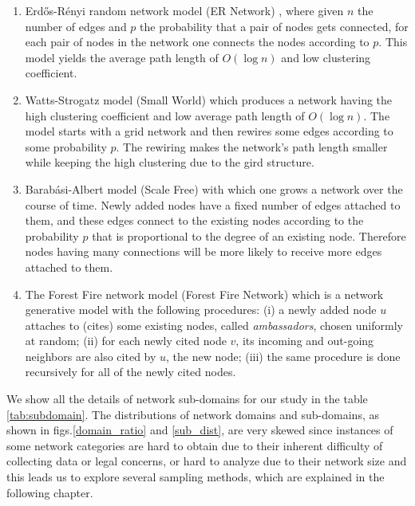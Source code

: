 \documentclass[..]{revtex4}
\begin{document}
	\begin{enumerate}
		\item Erd\H{o}s-R\'enyi random network model (ER Network) \cite{ER_Network}, where given $n$ the number of edges and $p$ the probability that a pair of nodes gets connected, for each pair of nodes in the network one connects the nodes according to $p$. This model yields the average path length of $O(\log n)$ and low clustering coefficient.
		
		\item Watts-Strogatz model (Small World) \cite{watts1998cds} which produces a network having the high clustering coefficient and low average path length of $O(\log n)$. The model starts with a grid network and then rewires some edges according to some probability $p$. The rewiring makes the network's path length smaller while keeping the high clustering due to the gird structure.
		
		\item Barab\'asi-Albert model (Scale Free) \cite{Barabasi99emergenceScaling} with which one grows a network over the course of time. Newly added nodes have a fixed number of edges attached to them, and these edges connect to the existing nodes according to the probability $p$ that is proportional to the degree of an existing node. Therefore nodes having many connections will be more likely to receive more edges attached to them.
		
		\item The Forest Fire network model (Forest Fire Network) \cite{ForestFire} which is a network generative model with the following procedures: (i) a newly added node $u$ attaches to (cites) some existing nodes, called \textit{ambassadors}, chosen uniformly at random; (ii) for each newly cited node $v$, its incoming and out-going neighbors are also cited by $u$, the new node; (iii) the same procedure is done recursively for all of the newly cited nodes.
	\end{enumerate}

We show all the details of network sub-domains for our study in the table \ref{tab:subdomain}. The distributions of network domains and sub-domains, as shown in figs.\ref{domain_ratio} and \ref{sub_dist}, are very skewed since instances of some network categories are hard to obtain due to their inherent difficulty of collecting data or legal concerns, or hard to analyze due to their network size and this leads us to explore several sampling methods, which are explained in the following chapter. 
\end{document}

